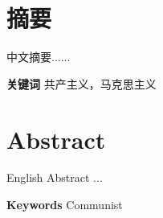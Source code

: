 \pagestyle{cAbstract}

\section*{摘要}
中文摘要......

\vskip 0.5cm
\noindent{}\textbf{关键词}\quad{}
共产主义，马克思主义

\newpage
\pagestyle{eAbstract}
\section*{Abstract}
English Abstract ...

\vskip 0.5cm
\noindent{}\textbf{Keywords}\quad{}
Communist

\newpage
\pagestyle{plain}